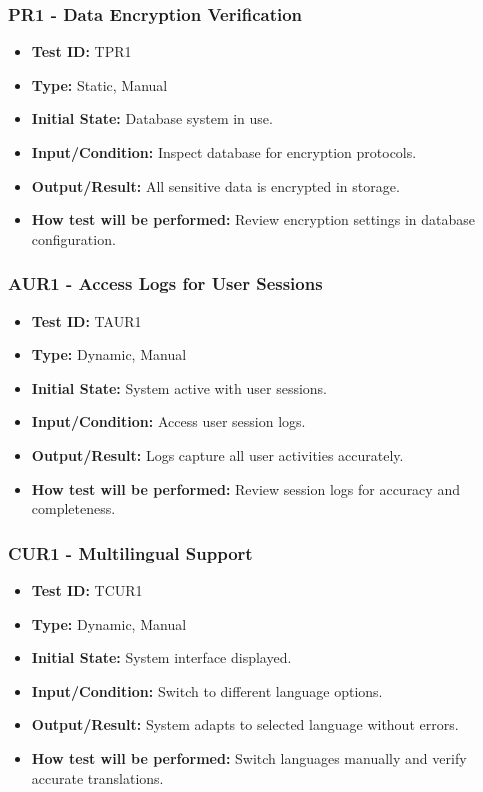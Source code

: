 \documentclass[12pt, titlepage]{article}
\begin{document}
\subsubsection{PR1 - Data Encryption Verification}
\begin{itemize}
    \item \textbf{Test ID:} TPR1
    \item \textbf{Type:} Static, Manual
    \item \textbf{Initial State:} Database system in use.
    \item \textbf{Input/Condition:} Inspect database for encryption protocols.
    \item \textbf{Output/Result:} All sensitive data is encrypted in storage.
    \item \textbf{How test will be performed:} Review encryption settings in database configuration.
\end{itemize}

\subsubsection{AUR1 - Access Logs for User Sessions}
\begin{itemize}
    \item \textbf{Test ID:} TAUR1
    \item \textbf{Type:} Dynamic, Manual
    \item \textbf{Initial State:} System active with user sessions.
    \item \textbf{Input/Condition:} Access user session logs.
    \item \textbf{Output/Result:} Logs capture all user activities accurately.
    \item \textbf{How test will be performed:} Review session logs for accuracy and completeness.
\end{itemize}

\subsubsection{CUR1 - Multilingual Support}
\begin{itemize}
    \item \textbf{Test ID:} TCUR1
    \item \textbf{Type:} Dynamic, Manual
    \item \textbf{Initial State:} System interface displayed.
    \item \textbf{Input/Condition:} Switch to different language options.
    \item \textbf{Output/Result:} System adapts to selected language without errors.
    \item \textbf{How test will be performed:} Switch languages manually and verify accurate translations.
\end{itemize}
\end{document}
